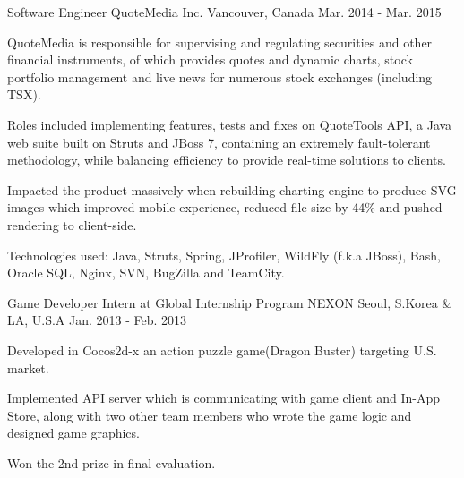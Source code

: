 \begin{cventries}
  \cventry
    {Software Engineer} %
    {QuoteMedia Inc.} %
    {Vancouver, Canada} %
    {Mar. 2014 - Mar. 2015} %
    {
      \begin{cvitems} %
        \item {QuoteMedia is responsible for supervising and regulating securities and other financial instruments, of which provides quotes and dynamic charts, stock portfolio management and live news for numerous stock exchanges (including TSX).}
        \item {Roles included implementing features, tests and fixes on QuoteTools API, a Java web suite built on Struts and JBoss 7, containing an extremely
        fault-tolerant methodology, while balancing efficiency to provide real-time solutions to clients.}
        \item {Impacted the product massively when rebuilding charting engine to produce SVG images which improved mobile
        experience, reduced file size by 44\% and pushed rendering to client-side.}
        \item {Technologies used: Java, Struts, Spring, JProfiler, WildFly (f.k.a JBoss), Bash, Oracle SQL, Nginx, SVN, BugZilla and TeamCity. }
     \end{cvitems}
    }

  \cventry
    {Game Developer Intern at Global Internship Program} %
    {NEXON} %
    {Seoul, S.Korea \& LA, U.S.A} %
    {Jan. 2013 - Feb. 2013} %
    {
      \begin{cvitems} %
        \item {Developed in Cocos2d-x an action puzzle game(Dragon Buster) targeting U.S. market.}
        \item {Implemented API server which is communicating with game client and In-App Store, along with two other team members who wrote the game logic and designed game graphics.}
        \item {Won the 2nd prize in final evaluation.}
      \end{cvitems}
    }

\end{cventries}
